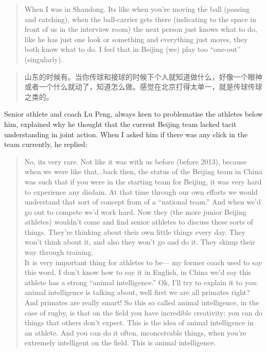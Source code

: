 \begin{CJK}{UTF8}{gbsn}
\begin{quote}
      When I was in Shandong. Its like when you're moving the ball (passing and catching), when the ball-carrier gets there (indicating to the space in front of us in the interview room) the next person just knows what to do, like he has just one look or something and everything just moves, they both know what to do. I feel that in Beijing (we) play too ``one-out'' (singularly).
\end{quote}

\begin{quote}
     	山东的时候有。当你传球和接球的时候下个人就知道做什么，好像一个眼神或者一个什么就动了，知道怎么做。感觉在北京打得太单一，就是传球传球之类的。
\end{quote}


Senior athlete and coach Lu Peng, always keen to problematise the athletes below him, explained why he thought that the current Beijing team lacked tacit understanding in joint action.  When I asked him if there was any click in the team currently, he replied:

      \begin{quote}
        No, its very rare.  Not like it was with us before (before 2013), because when we were like that...back then, the status of the Beijing team in China was such that if you were in the starting team for Beijing, it was very hard to experience any disdain.  At that time through our own efforts we would understand that sort of concept from of a ``national team.'' And when we'd go out to compete we'd work hard.  Now they (the more junior Beijing athletes) wouldn't come and find senior athletes to discuss these sorts of things.  They're thinking about their own little things every day.  They won't think about it, and also they won't go and do it.  They skimp their way through training.  \\

        It is very important thing for athletes to be--- my former coach used to say this word, I don't know how to say it in English, in China we'd say this athlete has a strong ``animal intelligence.'' Ok, I'll try to explain it to you: animal intelligence is talking about, well first we are all primates right?  And primates are really smart!  So this so called animal intelligence, in the case of rugby, is that on the field you have incredible creativity: you can do things that others don't expect.  This is the idea of animal intelligence in an athlete.  And you can do it often, inconceivable things, when you're extremely intelligent on the field. This is animal intelligence.
      \end{quote}


\end{CJK}

